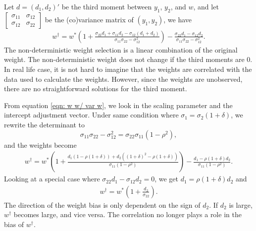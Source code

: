 \documentclass[11pt]{article}
\begin{document}
Let \(d = (d_1, d_2)'\) be the third moment between \(y_1\), \(y_2\), and $w$,
and let
\(\begin{bmatrix} \sigma_{11} & \sigma_{12}\\ \sigma_{12} & \sigma_{22}\end{bmatrix}\)
be the (co)variance matrix of $(y_1,y_2)$, we have
\begin{equation}
\label{eqn: w w/ var w}
\begin{aligned}
w^\dagger = w^*(1+\frac{\sigma_{22} d_1 + \sigma_{11} d_2 -\sigma_{12} (d_1 + d_2)}{\sigma_{11}\sigma_{22} - \sigma_{12}^2}) - \frac{\sigma_{22} d_1 - \sigma_{12}d_2}{\sigma_{11}\sigma_{22} - \sigma_{12}^2}.
\end{aligned}
\end{equation}
The non-deterministic weight selection is a linear combination of the
original weight. The non-deterministic weight does not change if the
third moments are \(0\). 
In real life case, it is not hard to imagine that the weights are correlated with the data used to calculate the weights. However, since the weights are unobserved, there are no straightforward solutions for the third moment.

From equation \ref{eqn: w w/ var w}, we look in the scaling parameter
and the intercept adjustment vector. Under same condition where
\(\sigma_1 =\sigma_2 (1 + \delta)\), we rewrite the determinant to
\begin{equation}
\sigma_{11}\sigma_{22} - \sigma_{12}^2 = \sigma_{22}\sigma_{11} (1- \rho^2),
\end{equation}
and the weights become
\begin{equation}
\label{eqn: scaling factors}
\begin{aligned}
w^\dagger = w^*(1+\frac{d_1(1- \rho(1+\delta)) + d_2 ((1+\delta)^2-\rho(1+\delta))} {\sigma_{11} (1- \rho^2)}) - \frac{d_1-\rho(1+\delta) d_2}{\sigma_{11}(1- \rho^2)}.
\end{aligned}
\end{equation}
Looking at a special case where $\sigma_{22} d_1 - \sigma_{12}d_2=0$, we get $d_1=\rho(1+\delta) d_2$ and 
\begin{equation}
\label{eqn: special case}
\begin{aligned}
w^\dagger = w^*(1+\frac{d_2} {\sigma_{22}}).
\end{aligned}
\end{equation}
The direction of the weight bias is only dependent on the sign of $d_2$. If $d_2$ is large, $w^\dagger$ becomes large, and vice versa. The correlation no longer plays a role in the bias of $w^\dagger$.
\end{document}
